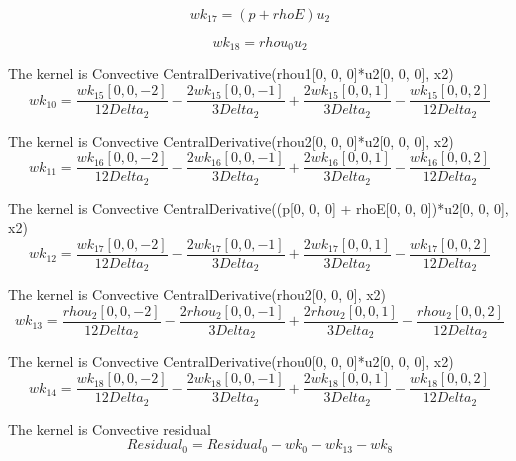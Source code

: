 \documentclass{article}
\begin{document}
\begin{dmath}{wk_{17}} = \left({p} + {rhoE}\right) {u_{2}}\end{dmath}

\begin{dmath}{wk_{18}} = {rhou_{0}} {u_{2}}\end{dmath}

The kernel is Convective CentralDerivative(rhou1[0, 0, 0]*u2[0, 0, 0], x2) \begin{dmath}{wk_{10}} = \frac{{wk_{15}}[{0,0,-2}]}{12 Delta_2} - 
\frac{2 {wk_{15}}[{0,0,-1}]}{3 Delta_2} + \frac{2 
{wk_{15}}[{0,0,1}]}{3 Delta_2} - \frac{{wk_{15}}[{0,0,2}]}{12 
Delta_2}\end{dmath}

The kernel is Convective CentralDerivative(rhou2[0, 0, 0]*u2[0, 0, 0], x2) \begin{dmath}{wk_{11}} = \frac{{wk_{16}}[{0,0,-2}]}{12 Delta_2} - 
\frac{2 {wk_{16}}[{0,0,-1}]}{3 Delta_2} + \frac{2 
{wk_{16}}[{0,0,1}]}{3 Delta_2} - \frac{{wk_{16}}[{0,0,2}]}{12 
Delta_2}\end{dmath}

The kernel is Convective CentralDerivative((p[0, 0, 0] + rhoE[0, 0, 0])*u2[0, 0, 0], x2) \begin{dmath}{wk_{12}} = \frac{{wk_{17}}[{0,0,-2}]}{12 Delta_2} - 
\frac{2 {wk_{17}}[{0,0,-1}]}{3 Delta_2} + \frac{2 
{wk_{17}}[{0,0,1}]}{3 Delta_2} - \frac{{wk_{17}}[{0,0,2}]}{12 
Delta_2}\end{dmath}

The kernel is Convective CentralDerivative(rhou2[0, 0, 0], x2) \begin{dmath}{wk_{13}} = \frac{{rhou_{2}}[{0,0,-2}]}{12 Delta_2} - 
\frac{2 {rhou_{2}}[{0,0,-1}]}{3 Delta_2} + \frac{2 
{rhou_{2}}[{0,0,1}]}{3 Delta_2} - \frac{{rhou_{2}}[{0,0,2}]}{12 
Delta_2}\end{dmath}

The kernel is Convective CentralDerivative(rhou0[0, 0, 0]*u2[0, 0, 0], x2) \begin{dmath}{wk_{14}} = \frac{{wk_{18}}[{0,0,-2}]}{12 Delta_2} - 
\frac{2 {wk_{18}}[{0,0,-1}]}{3 Delta_2} + \frac{2 
{wk_{18}}[{0,0,1}]}{3 Delta_2} - \frac{{wk_{18}}[{0,0,2}]}{12 
Delta_2}\end{dmath}

The kernel is Convective residual \begin{dmath}{Residual_{0}} = {Residual_{0}} - {wk_{0}} - {wk_{13}} - 
{wk_{8}}\end{dmath}
\end{document}
